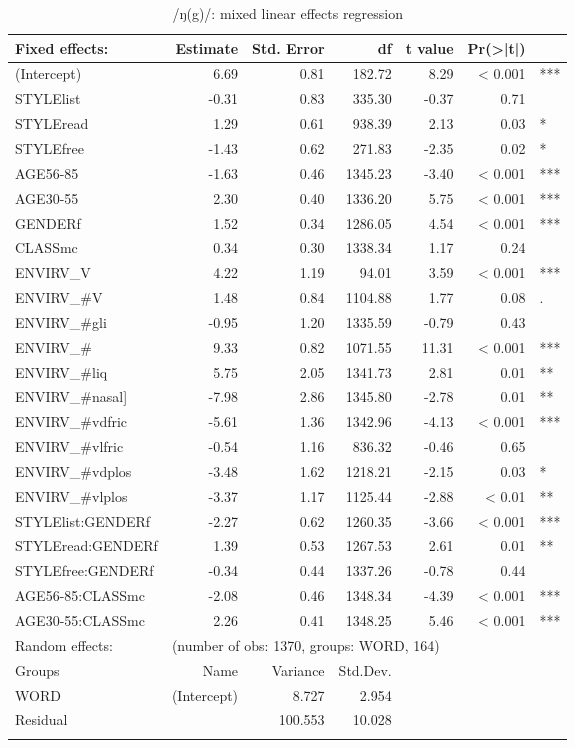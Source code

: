 \begin{table}
	
	\footnotesize
	\caption{/ŋ(g)/: mixed linear effects regression}
	\label{tab.regression.ng}
	\begin{tabular}{p{}rrrrrl}
		\lsptoprule
		Fixed effects: & Estimate & Std. Error & df & t value & Pr(>|t|) & \\
		\midrule
		(Intercept) & 6.69 & 0.81 & 182.72 & 8.29 & < 0.001 & *** \\ 
		STYLElist & -0.31 & 0.83 & 335.30 & -0.37 & 0.71 & \\ 
		STYLEread & 1.29 & 0.61 & 938.39 & 2.13 & 0.03 & *\\ 
		STYLEfree & -1.43 & 0.62 & 271.83 & -2.35 & 0.02 & *\\ 
		AGE56-85 & -1.63 & 0.46 & 1345.23 & -3.40 & < 0.001 & *** \\ 
		AGE30-55 & 2.30 & 0.40 & 1336.20 & 5.75 & < 0.001 & *** \\ 
		GENDERf & 1.52 & 0.34 & 1286.05 & 4.54 & < 0.001 & *** \\ 
		CLASSmc & 0.34 & 0.30 & 1338.34 & 1.17 & 0.24 & \\ 
		ENVIRV\_V & 4.22 & 1.19 & 94.01 & 3.59 & < 0.001 & *** \\ 
		ENVIRV\_\#V & 1.48 & 0.84 & 1104.88 & 1.77 & 0.08 & . \\ 
		ENVIRV\_\#gli & -0.95 & 1.20 & 1335.59 & -0.79 & 0.43 & \\ 
		ENVIRV\_\# & 9.33 & 0.82 & 1071.55 & 11.31 & < 0.001 & *** \\ 
		ENVIRV\_\#liq & 5.75 & 2.05 & 1341.73 & 2.81 & 0.01 & **\\ 
		ENVIRV\_\#nasal] & -7.98 & 2.86 & 1345.80 & -2.78 & 0.01 & **\\ 
		ENVIRV\_\#vdfric & -5.61 & 1.36 & 1342.96 & -4.13 & < 0.001 & *** \\ 
		ENVIRV\_\#vlfric & -0.54 & 1.16 & 836.32 & -0.46 & 0.65 & \\ 
		ENVIRV\_\#vdplos & -3.48 & 1.62 & 1218.21 & -2.15 & 0.03 & *\\ 
		ENVIRV\_\#vlplos & -3.37 & 1.17 & 1125.44 & -2.88 & < 0.01 & ** \\ 
		STYLElist:GENDERf & -2.27 & 0.62 & 1260.35 & -3.66 & < 0.001 & *** \\ 
		STYLEread:GENDERf & 1.39 & 0.53 & 1267.53 & 2.61 & 0.01 & ** \\ 
		STYLEfree:GENDERf & -0.34 & 0.44 & 1337.26 & -0.78 & 0.44 & \\ 
		AGE56-85:CLASSmc & -2.08 & 0.46 & 1348.34 & -4.39 & < 0.001 & *** \\ 
		AGE30-55:CLASSmc & 2.26 & 0.41 & 1348.25 & 5.46 & < 0.001 & *** \\ 
		\midrule
		Random effects: & \multicolumn{6}{l}{(number of obs: 1370, groups: WORD, 164)} \\
		Groups &         Name & Variance &      Std.Dev. & & & \\
		WORD &  (Intercept) & 8.727 & 2.954 & & & \\
		Residual  &         & 100.553 & 10.028 & & & \\
		\lspbottomrule
	\end{tabular}
\end{table}


